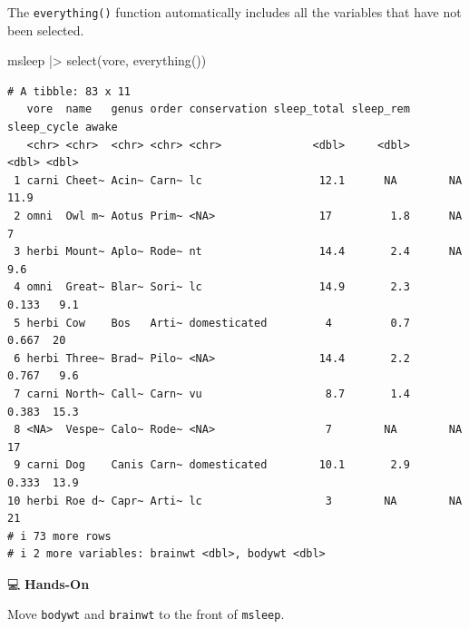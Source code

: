 \documentclass[
  letterpaper,
  DIV=11,
  numbers=noendperiod]{scrreprt}
\newenvironment{Shaded}{\begin{snugshade}}{\end{snugshade}}
\newcommand{\FunctionTok}[1]{\textcolor[rgb]{0.28,0.35,0.67}{#1}}
\newcommand{\NormalTok}[1]{\textcolor[rgb]{0.00,0.23,0.31}{#1}}
\newcommand{\SpecialCharTok}[1]{\textcolor[rgb]{0.37,0.37,0.37}{#1}}
\begin{document}
\begin{tcolorbox}[enhanced jigsaw, colbacktitle=quarto-callout-tip-color!10!white, opacitybacktitle=0.6, breakable, left=2mm, leftrule=.75mm, toprule=.15mm, toptitle=1mm, bottomtitle=1mm, colframe=quarto-callout-tip-color-frame, opacityback=0, coltitle=black, arc=.35mm, titlerule=0mm, colback=white, bottomrule=.15mm, title=\textcolor{quarto-callout-tip-color}{\faLightbulb}\hspace{0.5em}{Answer}, rightrule=.15mm]

The \texttt{everything()} function automatically includes all the
variables that have not been selected.

\begin{Shaded}
\begin{Highlighting}[]
\NormalTok{msleep }\SpecialCharTok{|\textgreater{}}
  \FunctionTok{select}\NormalTok{(vore, }\FunctionTok{everything}\NormalTok{())}
\end{Highlighting}
\end{Shaded}

\begin{verbatim}
# A tibble: 83 x 11
   vore  name   genus order conservation sleep_total sleep_rem sleep_cycle awake
   <chr> <chr>  <chr> <chr> <chr>              <dbl>     <dbl>       <dbl> <dbl>
 1 carni Cheet~ Acin~ Carn~ lc                  12.1      NA        NA      11.9
 2 omni  Owl m~ Aotus Prim~ <NA>                17         1.8      NA       7  
 3 herbi Mount~ Aplo~ Rode~ nt                  14.4       2.4      NA       9.6
 4 omni  Great~ Blar~ Sori~ lc                  14.9       2.3       0.133   9.1
 5 herbi Cow    Bos   Arti~ domesticated         4         0.7       0.667  20  
 6 herbi Three~ Brad~ Pilo~ <NA>                14.4       2.2       0.767   9.6
 7 carni North~ Call~ Carn~ vu                   8.7       1.4       0.383  15.3
 8 <NA>  Vespe~ Calo~ Rode~ <NA>                 7        NA        NA      17  
 9 carni Dog    Canis Carn~ domesticated        10.1       2.9       0.333  13.9
10 herbi Roe d~ Capr~ Arti~ lc                   3        NA        NA      21  
# i 73 more rows
# i 2 more variables: brainwt <dbl>, bodywt <dbl>
\end{verbatim}

\end{tcolorbox}

💻 \textbf{Hands-On}

Move \texttt{bodywt} and \texttt{brainwt} to the front of
\texttt{msleep}.
\end{document}
